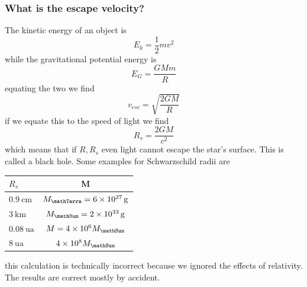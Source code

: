 \subsubsection{What is the escape velocity?}
The kinetic energy of an object is
\begin{equation}
    E_k = \frac{1}{2}mv^2
\end{equation}
while the gravitational potential energy is
\begin{equation}
    E_G = \frac{GMm}{R}
\end{equation}
equating the two we find
\begin{equation}
    v_{esc} = \sqrt{\frac{2GM}{R}}
\end{equation}
if we equate this to the speed of light we find
\begin{equation}
    R_s = \frac{2GM}{c^2}
\end{equation}
which means that if \(R,R_s\) even light cannot escape the star's surface. This is called a black hole. Some examples for Schwarzschild radii are
\begin{table}[!htb]
    \centering
    \begin{tabular}{l|c}
        \(R_s\) & M \\
        \hline
        \(\qty{0.9}{\centi\meter}\) & \(M_\mathTerra = \qty{6e27}{\gram}\) \\
        \(\qty{3}{\kilo\meter}\) & \(M_\mathSun = \qty{2e33}{\gram}\) \\
        \(\qty{0.08}{\astronomicalunit}\) & \(M = \qty{4e6}{}M_\mathSun \) \\
        \(\qty{8}{\astronomicalunit}\) & \(\qty{4e8}{} M_\mathSun \)
    \end{tabular}
\end{table}
this calculation is technically incorrect because we ignored the effects of relativity. The results are correct mostly by accident.
